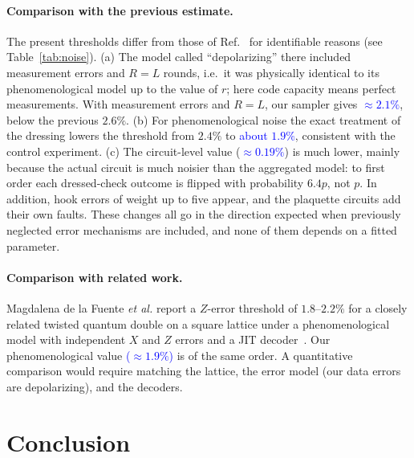 \documentclass[a4paper]{article}
\newcommand{\blue}[1]{\textcolor{blue}{#1}}
\begin{document}
\paragraph{Comparison with the previous estimate.}
The present thresholds differ from those of Ref.~\cite{haga2026aqis} for identifiable reasons (see Table~\ref{tab:noise}). (a) The model called ``depolarizing'' there included measurement errors and $R=L$ rounds, i.e.\ it was physically identical to its phenomenological model up to the value of $r$; here code capacity means perfect measurements. With measurement errors and $R=L$, our sampler gives \blue{$\approx2.1\%$}, below the previous $2.6\%$. (b) For phenomenological noise the exact treatment of the dressing lowers the threshold from $2.4\%$ to \blue{about $1.9\%$}, consistent with the control experiment. (c) The circuit-level value (\blue{$\approx0.19\%$}) is much lower, mainly because the actual circuit is much noisier than the aggregated model: to first order each dressed-check outcome is flipped with probability $6.4p$, not $p$. In addition, hook errors of weight up to five appear, and the plaquette circuits add their own faults. These changes all go in the direction expected when previously neglected error mechanisms are included, and none of them depends on a fitted parameter.

\paragraph{Comparison with related work.}
Magdalena de la Fuente \emph{et al.} report a $Z$-error threshold of $1.8$--$2.2\%$ for a closely related twisted quantum double on a square lattice under a phenomenological model with independent $X$ and $Z$ errors and a JIT decoder~\cite{magdalena2026}. Our phenomenological value \blue{($\approx1.9\%$)} is of the same order. A quantitative comparison would require matching the lattice, the error model (our data errors are depolarizing), and the decoders.

\section{Conclusion}
\label{sec:conclusion}
\end{document}
